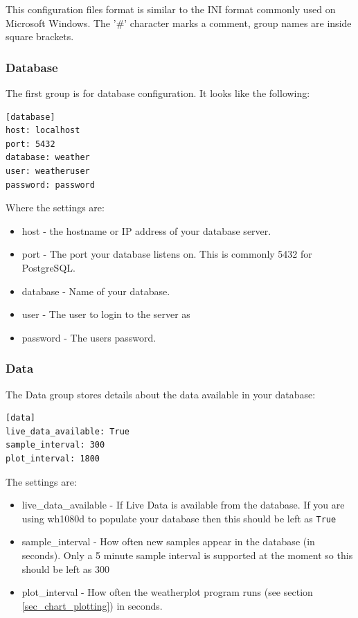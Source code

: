 \documentclass[a4paper,10pt,draft]{book}
\begin{document}
This configuration files format is similar to the INI format commonly used on Microsoft Windows. The '\#' character marks a comment, group names are inside square brackets.

\subsubsection{Database}
The first group is for database configuration. It looks like the following:
\begin{verbatim}
[database]
host: localhost
port: 5432
database: weather
user: weatheruser
password: password
\end{verbatim}

Where the settings are:
\begin{itemize}
\item host - the hostname or IP address of your database server.
\item port - The port your database listens on. This is commonly 5432 for PostgreSQL.
\item database - Name of your database.
\item user - The user to login to the server as
\item password - The users password.
\end{itemize}


\subsubsection{Data}
The Data group stores details about the data available in your database:

\begin{verbatim}
[data]
live_data_available: True
sample_interval: 300
plot_interval: 1800
\end{verbatim}

The settings are:
\begin{itemize}
\item live\_data\_available - If Live Data is available from the database. If you are using wh1080d to populate your database then this should be left as \verb|True|
\item sample\_interval - How often new samples appear in the database (in seconds). Only a 5 minute sample interval is supported at the moment so this should be left as 300
\item plot\_interval - How often the weatherplot program runs (see section \ref{sec_chart_plotting}) in seconds. 
\end{itemize}
\end{document}
